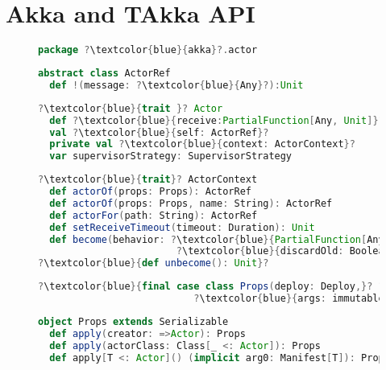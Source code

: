 \chapter{Akka and TAkka API}

\begin{figure}[!h]
\label{akka_api}

\begin{lstlisting}[language=scala, escapechar=?]
package ?\textcolor{blue}{akka}?.actor   
\end{lstlisting}
\vspace{-15pt }
    
\begin{lstlisting}[language=scala, escapechar=?]
abstract class ActorRef
  def !(message: ?\textcolor{blue}{Any}?):Unit
\end{lstlisting}
    \vspace{-15pt }
    
\begin{lstlisting}[language=scala, escapechar=?]
?\textcolor{blue}{trait }? Actor
  def ?\textcolor{blue}{receive:PartialFunction[Any, Unit]}?
  val ?\textcolor{blue}{self: ActorRef}?
  private val ?\textcolor{blue}{context: ActorContext}?
  var supervisorStrategy: SupervisorStrategy
\end{lstlisting}
    \vspace{-15pt }
    
\begin{lstlisting}[language=scala, escapechar=?]
?\textcolor{blue}{trait}? ActorContext
  def actorOf(props: Props): ActorRef
  def actorOf(props: Props, name: String): ActorRef
  def actorFor(path: String): ActorRef
  def setReceiveTimeout(timeout: Duration): Unit
  def become(behavior: ?\textcolor{blue}{PartialFunction[Any, Unit]}?, 
  						?\textcolor{blue}{discardOld: Boolean = true): Unit}?
?\textcolor{blue}{def unbecome(): Unit}?
    \end{lstlisting}
    \vspace{-15pt }
    
    \begin{lstlisting}[language=scala, escapechar=?]
?\textcolor{blue}{final case class Props(deploy: Deploy,}? ?\textcolor{blue}{clazz: Class[\_], }?
                           ?\textcolor{blue}{args: immutable.Seq[Any]) }?
    \end{lstlisting}
    \vspace{-15pt }
        
    \begin{lstlisting}[language=scala, escapechar=?]
object Props extends Serializable
  def apply(creator: =>Actor): Props
  def apply(actorClass: Class[_ <: Actor]): Props  
  def apply[T <: Actor]() (implicit arg0: Manifest[T]): Props  
    \end{lstlisting}
    \vspace{-15pt }
    

\end{figure}
